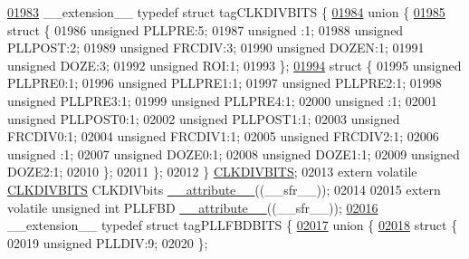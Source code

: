 \begin{DoxyCode}
\hypertarget{a00015_source_l01983}{}\hyperlink{a00014}{01983} \_\_extension\_\_ \textcolor{keyword}{typedef} \textcolor{keyword}{struct }tagCLKDIVBITS \{
\hypertarget{a00015_source_l01984}{}\hyperlink{a00015}{01984}   \textcolor{keyword}{union }\{
\hypertarget{a00015_source_l01985}{}\hyperlink{a00015}{01985}     \textcolor{keyword}{struct }\{
01986       \textcolor{keywordtype}{unsigned} PLLPRE:5;
01987       \textcolor{keywordtype}{unsigned} :1;
01988       \textcolor{keywordtype}{unsigned} PLLPOST:2;
01989       \textcolor{keywordtype}{unsigned} FRCDIV:3;
01990       \textcolor{keywordtype}{unsigned} DOZEN:1;
01991       \textcolor{keywordtype}{unsigned} DOZE:3;
01992       \textcolor{keywordtype}{unsigned} ROI:1;
01993     \};
\hypertarget{a00015_source_l01994}{}\hyperlink{a00015}{01994}     \textcolor{keyword}{struct }\{
01995       \textcolor{keywordtype}{unsigned} PLLPRE0:1;
01996       \textcolor{keywordtype}{unsigned} PLLPRE1:1;
01997       \textcolor{keywordtype}{unsigned} PLLPRE2:1;
01998       \textcolor{keywordtype}{unsigned} PLLPRE3:1;
01999       \textcolor{keywordtype}{unsigned} PLLPRE4:1;
02000       \textcolor{keywordtype}{unsigned} :1;
02001       \textcolor{keywordtype}{unsigned} PLLPOST0:1;
02002       \textcolor{keywordtype}{unsigned} PLLPOST1:1;
02003       \textcolor{keywordtype}{unsigned} FRCDIV0:1;
02004       \textcolor{keywordtype}{unsigned} FRCDIV1:1;
02005       \textcolor{keywordtype}{unsigned} FRCDIV2:1;
02006       \textcolor{keywordtype}{unsigned} :1;
02007       \textcolor{keywordtype}{unsigned} DOZE0:1;
02008       \textcolor{keywordtype}{unsigned} DOZE1:1;
02009       \textcolor{keywordtype}{unsigned} DOZE2:1;
02010     \};
02011   \};
02012 \} \hyperlink{a00014_d0/d61/a00302}{CLKDIVBITS};
02013 \textcolor{keyword}{extern} \textcolor{keyword}{volatile} \hyperlink{a00014_d0/d61/a00302}{CLKDIVBITS} CLKDIVbits \hyperlink{a00015_a493c46f03454991ccc5aa7a6e1dfb2a7}{\_\_attribute\_\_}((\_\_sfr\_\_));
02014 
02015 \textcolor{keyword}{extern} \textcolor{keyword}{volatile} \textcolor{keywordtype}{unsigned} \textcolor{keywordtype}{int}  PLLFBD \hyperlink{a00015_a493c46f03454991ccc5aa7a6e1dfb2a7}{\_\_attribute\_\_}((\_\_sfr\_\_));
\hypertarget{a00015_source_l02016}{}\hyperlink{a00014}{02016} \_\_extension\_\_ \textcolor{keyword}{typedef} \textcolor{keyword}{struct }tagPLLFBDBITS \{
\hypertarget{a00015_source_l02017}{}\hyperlink{a00015}{02017}   \textcolor{keyword}{union }\{
\hypertarget{a00015_source_l02018}{}\hyperlink{a00015}{02018}     \textcolor{keyword}{struct }\{
02019       \textcolor{keywordtype}{unsigned} PLLDIV:9;
02020     \};

\end{DoxyCode}
